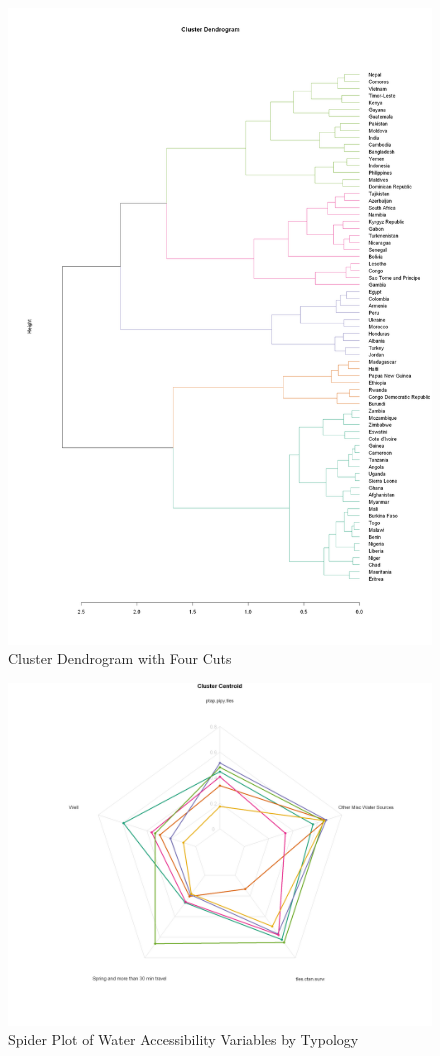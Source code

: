 \documentclass[10pt,twoside]{article}
\numberwithin{equation}{section}
\newcommand{\?}{\stackrel{?}{=}}
\begin{document}
\begin{figure}[h!]
\raggedright
  \includegraphics[width=1.15\textwidth]{dendrogram}
  \caption{Cluster Dendrogram with Four Cuts}
  \label{fig:dendrogram}
\end{figure}

\begin{figure}[h!]
  \centering
  \includegraphics[width= 1\textwidth]{spider-plot}
  \caption{Spider Plot of Water Accessibility Variables by Typology}
  \label{fig:spider}
\end{figure}
\end{document}

